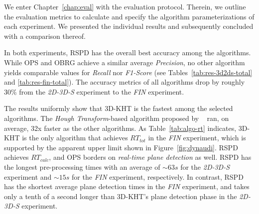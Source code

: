 \documentclass[main.tex]{subfiles}
\begin{document}
We enter Chapter~\ref{chap:eval} with the evaluation protocol. Therein, we outline the evaluation metrics to calculate and specify the algorithm parameterizations of each experiment. We presented the individual results and subsequently concluded with a comparison thereof.


In both experiments, RSPD has the overall best accuracy among the algorithms. While OPS and OBRG achieve a similar average \textit{Precision}, no other algorithm yields comparable values for \textit{Recall} nor \textit{F1-Score} (see Tables~\ref{tab:res-3d2ds-total} and \ref{tab:res-fin-total}). The accuracy metrics of all algorithms drop by roughly $30\%$ from the \textit{2D-3D-S} experiment to the \textit{FIN} experiment.

The results uniformly show that 3D-KHT is the fastest among the selected algorithms. The \textit{Hough Transform}-based algorithm proposed by \citeauthor{LimbergerOliveira2015HT3D}~\cite{LimbergerOliveira2015HT3D} ran, on average, 32x faster as the other algorithms. As Table~\ref{tab:algo-rt} indicates, 3D-KHT is the only algorithm that achieves $RT_{tot}$ in the \textit{FIN} experiment, which is supported by the apparent upper limit shown in Figure~\ref{fig:dynaudi}. RSPD achieves $RT_{calc}$, and OPS borders on \textit{real-time plane detection} as well. RSPD has the longest pre-processing times with an average of ${\sim}63s$ for the \textit{2D-3D-S} experiment and ${\sim}15s$ for the \textit{FIN} experiment, respectively. In contrast, RSPD has the shortest average plane detection times in the \textit{FIN} experiment, and takes only a tenth of a second longer than 3D-KHT's plane detection phase in the \textit{2D-3D-S} experiment.
\end{document}
